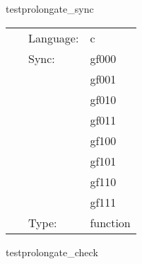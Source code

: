 
\hspace{5mm} testprolongate\_sync 

\hspace{5mm}{\it sync test data } 


\hspace{5mm}

 \begin{tabular*}{160mm}{cll} 
~ & Language:  & c \\ 
~ & Sync:  & gf000 \\ 
~& ~ &gf001\\ 
~& ~ &gf010\\ 
~& ~ &gf011\\ 
~& ~ &gf100\\ 
~& ~ &gf101\\ 
~& ~ &gf110\\ 
~& ~ &gf111\\ 
~ & Type:  & function \\ 
\end{tabular*} 


\vspace{5mm}


\hspace{5mm} testprolongate\_check 

\hspace{5mm}{\it compute error } 


\hspace{5mm}

